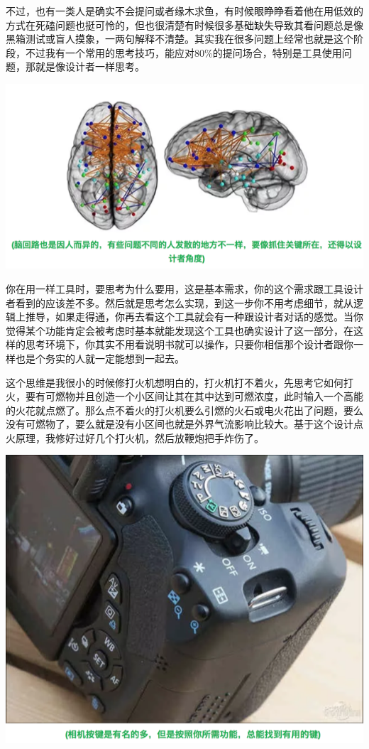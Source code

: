 \documentclass[]{book}
\begin{document}
不过，也有一类人是确实不会提问或者缘木求鱼，有时候眼睁睁看着他在用低效的方式在死磕问题也挺可怜的，但也很清楚有时候很多基础缺失导致其看问题总是像黑箱测试或盲人摸象，一两句解释不清楚。其实我在很多问题上经常也就是这个阶段，不过我有一个常用的思考技巧，能应对80\%的提问场合，特别是工具使用问题，那就是像设计者一样思考。

\includegraphics[width=8.33in]{images/sheji2}

你在用一样工具时，要思考为什么要用，这是基本需求，你的这个需求跟工具设计者看到的应该差不多。然后就是思考怎么实现，到这一步你不用考虑细节，就从逻辑上推导，如果走得通，你再去看这个工具就会有一种跟设计者对话的感觉。当你觉得某个功能肯定会被考虑时基本就能发现这个工具也确实设计了这一部分，在这样的思考环境下，你其实不用看说明书就可以操作，只要你相信那个设计者跟你一样也是个务实的人就一定能想到一起去。

这个思维是我很小的时候修打火机想明白的，打火机打不着火，先思考它如何打火，要有可燃物并且创造一个小区间让其在其中达到可燃浓度，此时输入一个高能的火花就点燃了。那么点不着火的打火机要么引燃的火石或电火花出了问题，要么没有可燃物了，要么就是没有小区间也就是外界气流影响比较大。基于这个设计点火原理，我修好过好几个打火机，然后放鞭炮把手炸伤了。

\includegraphics[width=8.33in]{images/sheji3}
\end{document}
